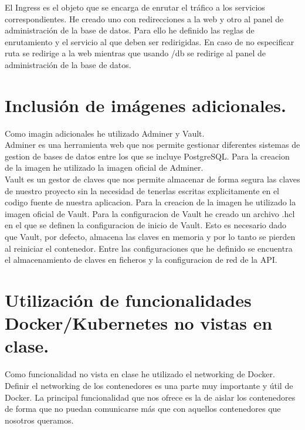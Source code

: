 \documentclass{report}
\begin{document}
            El Ingress es el objeto que se encarga de enrutar el tráfico a los servicios correspondientes.
            He creado uno con redirecciones a la web y otro al panel de administración de la base de datos.
            Para ello he definido las reglas de enrutamiento y el servicio al que deben ser redirigidas.
            En caso de no especificar ruta se redirige a la web mientras que usando /db se redirige al panel de administración de la base de datos.\\
        \clearpage
        \section{Inclusión de imágenes adicionales.}
            Como imagin adicionales he utilizado Adminer y Vault.\\
            
            Adminer es una herramienta web que nos permite gestionar diferentes sistemas de gestion de bases de datos entre los que se incluye PostgreSQL.
            Para la creacion de la imagen he utilizado la imagen oficial de Adminer.\\

            Vault es un gestor de claves que nos permite almacenar de forma segura las claves de nuestro proyecto sin la necesidad de tenerlas escritas explicitamente en el codigo fuente de nuestra aplicacion.
            Para la creacion de la imagen he utilizado la imagen oficial de Vault.
            Para la configuracion de Vault he creado un archivo .hcl en el que se definen la configuracion de inicio de Vault. 
            Esto es necesario dado que Vault, por defecto, almacena las claves en memoria y por lo tanto se pierden al reiniciar el contenedor.
            Entre las configuraciones que he definido se encuentra el almacenamiento de claves en ficheros y la configuracion de red de la API.\\
        \clearpage
        \section{Utilización de funcionalidades Docker/Kubernetes no vistas en clase.}
                Como funcionalidad no vista en clase he utilizado el networking de Docker.
                Definir el networking de los contenedores es una parte muy importante y útil de Docker.
                La principal funcionalidad que nos ofrece es la de aislar los contenedores de forma que no puedan comunicarse más que con aquellos contenedores que nosotros queramos.\\
\end{document}
